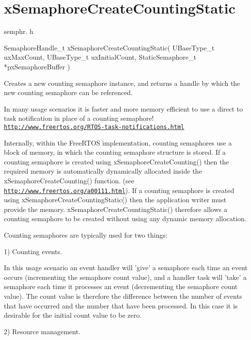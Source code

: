 \hypertarget{group__xSemaphoreCreateCountingStatic}{\section{x\-Semaphore\-Create\-Counting\-Static}
\label{group__xSemaphoreCreateCountingStatic}
}
semphr. h 
\begin{DoxyPre}SemaphoreHandle\_t xSemaphoreCreateCountingStatic( UBaseType\_t uxMaxCount, UBaseType\_t uxInitialCount, StaticSemaphore\_t *pxSemaphoreBuffer )\end{DoxyPre}


Creates a new counting semaphore instance, and returns a handle by which the new counting semaphore can be referenced.

In many usage scenarios it is faster and more memory efficient to use a direct to task notification in place of a counting semaphore! \href{http://www.freertos.org/RTOS-task-notifications.html}{\tt http\-://www.\-freertos.\-org/\-R\-T\-O\-S-\/task-\/notifications.\-html}

Internally, within the Free\-R\-T\-O\-S implementation, counting semaphores use a block of memory, in which the counting semaphore structure is stored. If a counting semaphore is created using x\-Semaphore\-Create\-Counting() then the required memory is automatically dynamically allocated inside the x\-Semaphore\-Create\-Counting() function. (see \href{http://www.freertos.org/a00111.html}{\tt http\-://www.\-freertos.\-org/a00111.\-html}). If a counting semaphore is created using x\-Semaphore\-Create\-Counting\-Static() then the application writer must provide the memory. x\-Semaphore\-Create\-Counting\-Static() therefore allows a counting semaphore to be created without using any dynamic memory allocation.

Counting semaphores are typically used for two things\-:

1) Counting events.

In this usage scenario an event handler will 'give' a semaphore each time an event occurs (incrementing the semaphore count value), and a handler task will 'take' a semaphore each time it processes an event (decrementing the semaphore count value). The count value is therefore the difference between the number of events that have occurred and the number that have been processed. In this case it is desirable for the initial count value to be zero.

2) Resource management.

